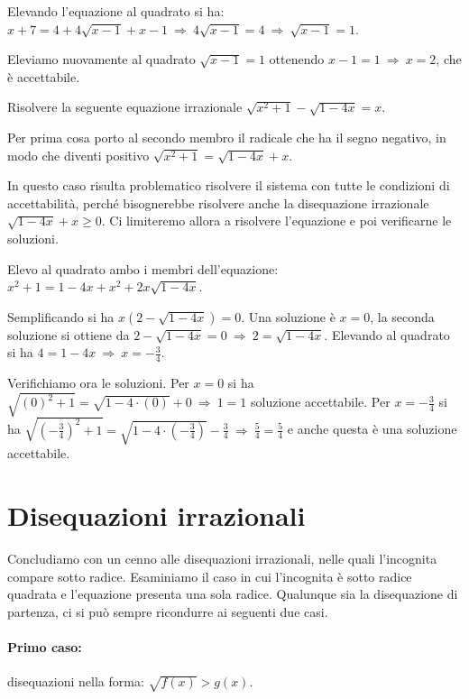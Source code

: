 \begin{exrig}
\begin{esempio}
Elevando l'equazione al quadrato si ha: $x+7=4+4\sqrt{x-1}+x-1 \:\Rightarrow\: 4\sqrt{x-1}=4 \:\Rightarrow\: \sqrt{x-1}=1$.

Eleviamo nuovamente al quadrato $\sqrt{x-1}=1$ ottenendo $x-1=1\:\Rightarrow\: x=2$, che è accettabile.
\end{esempio}

\begin{esempio}
Risolvere la seguente equazione irrazionale $\sqrt{x^2+1}-\sqrt{1-4x}=x$.

Per prima cosa porto al secondo membro il radicale che ha il segno negativo, in modo che diventi positivo $\sqrt{x^2+1}=\sqrt{1-4x}+x$.

In questo caso risulta problematico risolvere il sistema con tutte le condizioni di accettabilità, perché bisognerebbe risolvere anche la disequazione irrazionale $\sqrt{1-4x}+x\ge 0$.
Ci limiteremo allora a risolvere l'equazione e poi verificarne le soluzioni.

Elevo al quadrato ambo i membri dell'equazione: $x^2+1=1-4x+x^2+2x\sqrt{1-4x}$.

Semplificando si ha $x(2-\sqrt{1-4x})=0$. Una soluzione è $x=0$, la seconda soluzione si ottiene da $2-\sqrt{1-4x}=0\:\Rightarrow\: 2=\sqrt{1-4x}$. Elevando al quadrato si ha $4=1-4x\:\Rightarrow\: x=-\frac 3 4$.

Verifichiamo ora le soluzioni. Per $x=0$ si ha $\sqrt{(0)^2+1}=\sqrt{1-4\cdot (0)}+0\:\Rightarrow\: 1=1$ soluzione accettabile. Per $x=-\frac 3 4$ si ha $\sqrt{\left(-\frac 3 4\right)^2+1}=\sqrt{1-4\cdot\left(-\frac 3 4\right)}-\frac 3 4\:\Rightarrow\:\frac 5 4=\frac 5 4$ e anche questa è una soluzione accettabile.
\end{esempio}
\end{exrig}
\ovalbox{\risolvii \ref{ese:8.10}, \ref{ese:8.11}, \ref{ese:8.12}, \ref{ese:8.13}, \ref{ese:8.14}, \ref{ese:8.15}, \ref{ese:8.16}, \ref{ese:8.17}, \ref{ese:8.18}}

\section{Disequazioni irrazionali}

Concludiamo con un cenno alle disequazioni irrazionali, nelle quali l'incognita compare sotto radice. Esaminiamo il caso in cui l'incognita è sotto radice quadrata e l'equazione presenta una sola radice. Qualunque sia la disequazione di partenza, ci si può sempre ricondurre ai seguenti due casi.

\paragraph{Primo caso:} disequazioni nella forma: $\sqrt{f(x)}>g(x)$.

